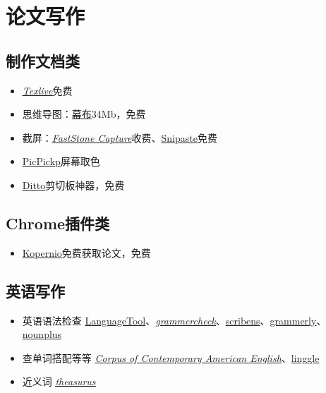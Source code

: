 \documentclass[UTF8,oneside]{ctexbook}
\begin{document}
\section{论文写作}
\subsection{制作文档类}
\begin{itemize}
	\item \underline{\textit{\href{https://mirrors.tuna.tsinghua.edu.cn/CTAN/systems/texlive/Images/}{Texlive}}}\quad 免费
	\item 思维导图：\href{https://mubu.com}{幕布}\quad 34Mb，免费
	\item 截屏：\underline{\textit{\href{http://www.faststone.org/FSCaptureDetail.htm}{FastStone Capture}}}\quad 收费、\href{https://www.snipaste.com}{Snipaste}\quad 免费
	\item \href{https://picpick.app/zh/}{PicPickp}\quad 屏幕取色
	\item \href{https://ditto-cp.sourceforge.io}{Ditto}\quad 剪切板神器，免费
\end{itemize}

\subsection{Chrome插件类}
\begin{itemize}
	\item \href{https://kopernio.com}{Kopernio}\quad 免费获取论文，免费
\end{itemize}

\subsection{英语写作}
\begin{itemize}
	\item 英语语法检查 \href{https://languagetool.org}{LanguageTool}、\underline{\textit{\href{https://www.grammarcheck.net}{grammercheck}}}、\href{https://www.scribens.com}{scribens}、\href{https://www.grammarly.com}{grammerly}、\href{https://www.nounplus.net}{nounplus}
	\item 查单词搭配等等 \underline{\textit{\href{https://www.english-corpora.org/coca/}{ Corpus of Contemporary American English}}}、\href{https://www.lintcode.com}{linggle}
	\item 近义词 \underline{\textit{\href{https://www.thesaurus.com}{theasurus}}}
\end{itemize}
\end{document}
